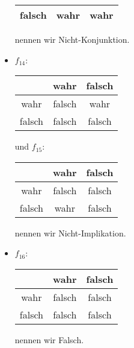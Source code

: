 \begin{solution}
\begin{itemize}
\begin{tabular}{|c|c|c|}
 \hline
 falsch & wahr & wahr\\
 \hline
 \end{tabular} nennen wir Nicht-Konjunktion.
 \item
 $f_{14}$:\quad\begin{tabular}{|c|c|c|}
 \hline
 & wahr & falsch \\
 \hline
 wahr & falsch & wahr \\
 \hline
 falsch & falsch & falsch\\
 \hline
 \end{tabular} und
 $f_{15}$:\quad\begin{tabular}{|c|c|c|}
 \hline
 & wahr & falsch \\
 \hline
 wahr & falsch & falsch \\
 \hline
 falsch & wahr & falsch\\
 \hline
 \end{tabular} nennen wir Nicht-Implikation.
  \item
  $f_{16}$:\quad\begin{tabular}{|c|c|c|}
  \hline
  & wahr & falsch \\
  \hline
  wahr & falsch & falsch \\
  \hline
  falsch & falsch & falsch\\
  \hline
  \end{tabular} nennen wir Falsch.
\end{itemize}

\end{solution}

